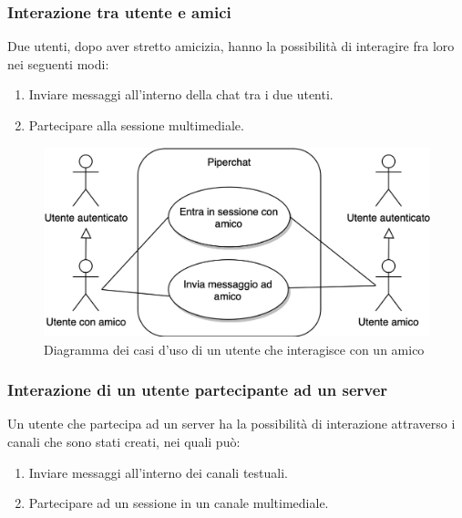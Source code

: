 %
%
%
\subsubsection{Interazione tra utente e amici}

Due utenti, dopo aver stretto amicizia, hanno la possibilità di interagire fra loro nei seguenti modi:

\begin{enumerate}
    \item Inviare messaggi all'interno della chat tra i due utenti.

    \item Partecipare alla sessione multimediale.
\end{enumerate}

\begin{figure}[H]
    \centering
    \includegraphics[width=1\linewidth]{sections/01-goal/img/use-cases/piperchat-Casi d'uso-4.jpg}
    \caption{Diagramma dei casi d'uso di un utente che interagisce con un amico}
\end{figure}

%
%
%
\subsubsection{Interazione di un utente partecipante ad un server}

Un utente che partecipa ad un server ha la possibilità di interazione attraverso i canali che sono stati creati, nei quali può:

\begin{enumerate}
    \item Inviare messaggi all'interno dei canali testuali.

    \item Partecipare ad un sessione in un canale multimediale.
\end{enumerate}

